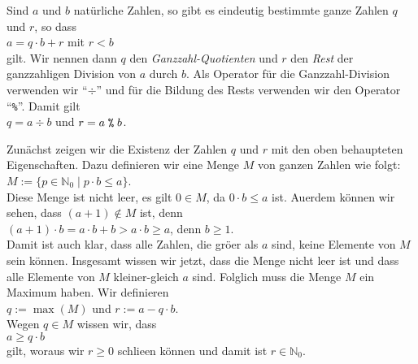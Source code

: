 \begin{Satz}
  \label{satz:division_mit_rest}
  Sind $a$ und $b$ nat\"{u}rliche Zahlen, so gibt es eindeutig bestimmte ganze Zahlen 
  $q$ und $r$, so dass 
  \\[0.2cm]
  \hspace*{1.3cm}
  $a = q \cdot b + r$ \quad mit $r < b$
  \\[0.2cm]
  gilt.  Wir nennen dann $q$ den {\emph{\color{blue}Ganzzahl-Quotienten}} und $r$ den {\emph{\color{blue}Rest}} der ganzzahligen
  Division von $a$ durch $b$.  Als Operator f\"{u}r die Ganzzahl-Division verwenden wir ``$\div$''
  und f\"{u}r die Bildung des Rests verwenden wir den Operator ``\texttt{\%}''.
  Damit gilt 
  \\[0.2cm]
  \hspace*{1.3cm}
  $q = a \div b$ \quad und \quad $r = a \;\texttt{\%}\; b$.
\end{Satz}  

\proof
Zun\"{a}chst zeigen wir die Existenz der Zahlen $q$ und $r$ mit den oben behaupteten Eigenschaften.
Dazu definieren wir eine Menge $M$ von ganzen Zahlen wie folgt:
\\[0.2cm]
\hspace*{1.3cm}
$M := \{ p \in \mathbb{N}_0 \mid p \cdot b \leq a \}$.
\\[0.2cm]
Diese Menge ist nicht leer, es gilt $0 \in M$, da $0 \cdot b \leq a$ ist.
Au\3erdem k\"{o}nnen wir sehen, dass $(a+1) \not\in M$ ist, denn
\\[0.2cm]
\hspace*{1.3cm}
$(a+1) \cdot b = a \cdot b + b > a \cdot b \geq a$, \quad denn $b \geq 1$.
\\[0.2cm]
Damit ist auch klar, dass alle Zahlen, die gr\"{o}\3er als $a$ sind, keine Elemente
von $M$ sein k\"{o}nnen.  Insgesamt wissen wir jetzt, dass die Menge nicht leer ist und dass alle
Elemente von $M$ kleiner-gleich $a$ sind.  Folglich muss die Menge $M$ ein Maximum haben.
Wir definieren
\\[0.2cm]
\hspace*{1.3cm}
$q := \max(M)$ \quad und \quad $r := a - q \cdot b$.
\\[0.2cm]
Wegen $q \in M$ wissen wir, dass
\\[0.2cm]
\hspace*{1.3cm}
$a \geq q \cdot b$
\\[0.2cm]
gilt, woraus wir $r \geq 0$ schlie\3en k\"{o}nnen und damit ist $r \in \mathbb{N}_0$.

